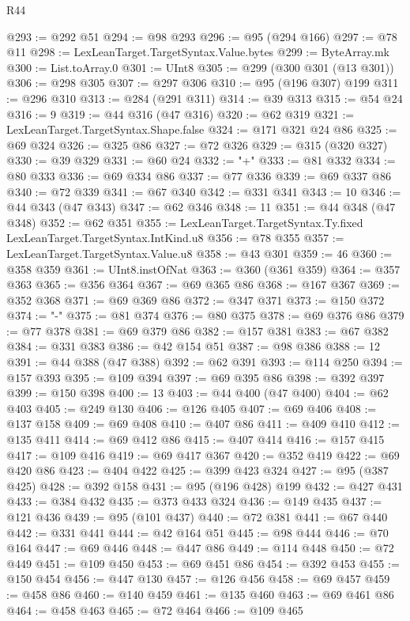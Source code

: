 \begin{lexlean}{R44}
\begin{coremodule}
@293 := @292 @51
@294 := @98 @293
@296 := @95 (@294 @166)
@297 := @78 @11
@298 := LexLeanTarget.TargetSyntax.Value.bytes
@299 := ByteArray.mk
@300 := List.toArray.{0}
@301 := UInt8
@305 := @299 (@300 @301 (@13 @301))
@306 := @298 @305
@307 := @297 @306
@310 := @95 (@196 @307) @199
@311 := @296 @310
@313 := @284 (@291 @311)
@314 := @39 @313
@315 := @54 @24
@316 := 9
@319 := @44 @316 (@47 @316)
@320 := @62 @319
@321 := LexLeanTarget.TargetSyntax.Shape.false
@324 := @171 @321 @24 @86
@325 := @69 @324
@326 := @325 @86
@327 := @72 @326
@329 := @315 (@320 @327)
@330 := @39 @329
@331 := @60 @24
@332 := "+"
@333 := @81 @332
@334 := @80 @333
@336 := @69 @334 @86
@337 := @77 @336
@339 := @69 @337 @86
@340 := @72 @339
@341 := @67 @340
@342 := @331 @341
@343 := 10
@346 := @44 @343 (@47 @343)
@347 := @62 @346
@348 := 11
@351 := @44 @348 (@47 @348)
@352 := @62 @351
@355 := LexLeanTarget.TargetSyntax.Ty.fixed LexLeanTarget.TargetSyntax.IntKind.u8
@356 := @78 @355
@357 := LexLeanTarget.TargetSyntax.Value.u8
@358 := @43 @301
@359 := 46
@360 := @358 @359
@361 := UInt8.instOfNat
@363 := @360 (@361 @359)
@364 := @357 @363
@365 := @356 @364
@367 := @69 @365 @86
@368 := @167 @367
@369 := @352 @368
@371 := @69 @369 @86
@372 := @347 @371
@373 := @150 @372
@374 := "-"
@375 := @81 @374
@376 := @80 @375
@378 := @69 @376 @86
@379 := @77 @378
@381 := @69 @379 @86
@382 := @157 @381
@383 := @67 @382
@384 := @331 @383
@386 := @42 @154 @51
@387 := @98 @386
@388 := 12
@391 := @44 @388 (@47 @388)
@392 := @62 @391
@393 := @114 @250
@394 := @157 @393
@395 := @109 @394
@397 := @69 @395 @86
@398 := @392 @397
@399 := @150 @398
@400 := 13
@403 := @44 @400 (@47 @400)
@404 := @62 @403
@405 := @249 @130
@406 := @126 @405
@407 := @69 @406
@408 := @137 @158
@409 := @69 @408
@410 := @407 @86
@411 := @409 @410
@412 := @135 @411
@414 := @69 @412 @86
@415 := @407 @414
@416 := @157 @415
@417 := @109 @416
@419 := @69 @417 @367
@420 := @352 @419
@422 := @69 @420 @86
@423 := @404 @422
@425 := @399 @423 @324
@427 := @95 (@387 @425)
@428 := @392 @158
@431 := @95 (@196 @428) @199
@432 := @427 @431
@433 := @384 @432
@435 := @373 @433 @324
@436 := @149 @435
@437 := @121 @436
@439 := @95 (@101 @437)
@440 := @72 @381
@441 := @67 @440
@442 := @331 @441
@444 := @42 @164 @51
@445 := @98 @444
@446 := @70 @164
@447 := @69 @446
@448 := @447 @86
@449 := @114 @448
@450 := @72 @449
@451 := @109 @450
@453 := @69 @451 @86
@454 := @392 @453
@455 := @150 @454
@456 := @447 @130
@457 := @126 @456
@458 := @69 @457
@459 := @458 @86
@460 := @140 @459
@461 := @135 @460
@463 := @69 @461 @86
@464 := @458 @463
@465 := @72 @464
@466 := @109 @465

\end{coremodule}
\end{lexlean}
